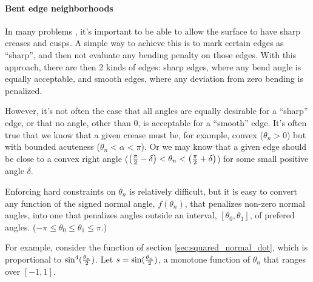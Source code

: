 
\paragraph{Bent edge neighborhoods}
\label{sec:Bent-edge-neighborhoods}

In many problems \cite{hoppe-et-al-94,hoppe-thesis-94},
it's important to be able to allow the surface to have
sharp creases and cusps.
A simple way to achieve this is to mark
certain edges as ``sharp'',
and then not evaluate any bending penalty
on those edges.
With this approach, there are then 2 kinds of edges:
sharp edges, where any bend angle is equally acceptable,
and smooth edges, 
where any deviation from zero bending is penalized.

However, it's not often the case that all angles
are equally desirable for a ``sharp'' edge,
or that no angle, other than $0$, is acceptable
for a ``smooth'' edge.
It's often true that we know that a given crease
must be, for example, convex ($\theta_n > 0$)
but with bounded acuteness ($\theta_n < \alpha < \pi$).
Or we may know that a given edge should be close to
a convex right angle 
($\left( {\pi \over 2} - \delta \right) 
< \theta_n < 
\left( {\pi \over 2} + \delta \right)$)
for some small positive angle $\delta$.

Enforcing hard constraints on $\theta_n$
is relatively difficult,
but it is easy to convert any function
of the signed normal angle, $f(\theta_n)$,
that penalizes non-zero normal angles,
into one that penalizes angles 
outside an interval, $\left[\theta_0,\theta_1\right]$,
of prefered angles.
($-\pi \leq \theta_0 \leq \theta_1 \leq \pi$.)

For example,
consider the function of section \ref{sec:squared_normal_dot},
which is proportional to $\sin^4({\theta_n \over 2})$. 
Let $s = \sin({\theta_n \over 2})$,
a monotone function of $\theta_n$ 
that ranges over $\left[ -1, 1 \right]$.

